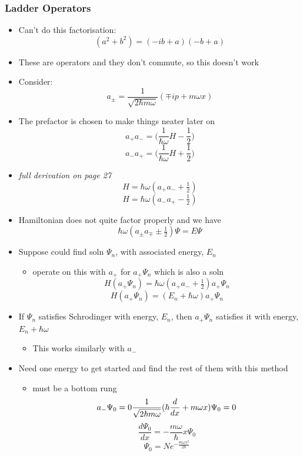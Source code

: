 \documentclass[a4paper,11pt,normalem]{article}
\begin{document}
\subsubsection{Ladder Operators}
\begin{itemize}
\item
  Can't do this factorisation: \[
  (a^2 + b^2) = (-ib + a)(-b + a)
  \]
\item
  These are operators and they don't commute, so this doesn't work
\item
  Consider: \[
  a_{\pm} = \frac{1}{\sqrt{2\hbar m\omega}}(\mp ip + m\omega x)
  \]
\item
  The prefactor is chosen to make things neater later on \[
  a_{+}a_{-} = \Big(\frac{1}{\hbar\omega}H - \frac{1}{2} \Big)
  \] \[
  a_{-}a_{+} = \Big(\frac{1}{\hbar\omega}H + \frac{1}{2} \Big)
  \]
\item
  \emph{full derivation on page 27} \[
  H = \hbar\omega (a_{+}a_{-} + \tfrac{1}{2})
  \] \[
  H = \hbar\omega (a_{-}a_{+} - \tfrac{1}{2})
  \]
\item
  Hamiltonian does not quite factor properly and we have \[
  \hbar\omega (a_{\pm}a_{\mp} \pm \tfrac{1}{2})\Psi = E\Psi
  \]
\item
  Suppose could find soln \(\Psi_n\), with associated energy, \(E_n\)
  \begin{itemize}
  \item
    operate on this with \(a_+\) for \(a_{+}\Psi_n\) which is also a
    soln \[
    H(a_{+}\Psi_n) = \hbar\omega (a_{+}a_{-} + \tfrac{1}{2})a_{+}\Psi_n
    \] \[
    H(a_{+}\Psi_{n}) = (E_n + \hbar\omega)a_{+}\Psi_n
    \]
  \end{itemize}
\item
  If \(\Psi_n\) satisfies Schrodinger with energy, \(E_n\), then
  \(a_{+}\Psi_n\) satisfies it with energy, \(E_n + \hbar \omega\)
  \begin{itemize}
  \item
    This works similarly with \(a_{-}\)
  \end{itemize}
\item
  Need one energy to get started and find the rest of them with this
  method
  \begin{itemize}
  \item
    must be a bottom rung \[
    a_{-}\Psi_{0} = 0 \\
    \frac{1}{\sqrt{2\hbar m\omega}}(\hbar\frac{d}{dx} + m\omega x)\Psi_0 = 0
    \] \[
    \frac{d\Psi_0}{dx} = -\frac{m\omega}{\hbar}x\Psi_0
    \] \[
    \Psi_0 = Ne^{-\tfrac{m\omega x^2}{2\hbar}}
\]
\end{itemize}
\end{itemize}
\end{document}
